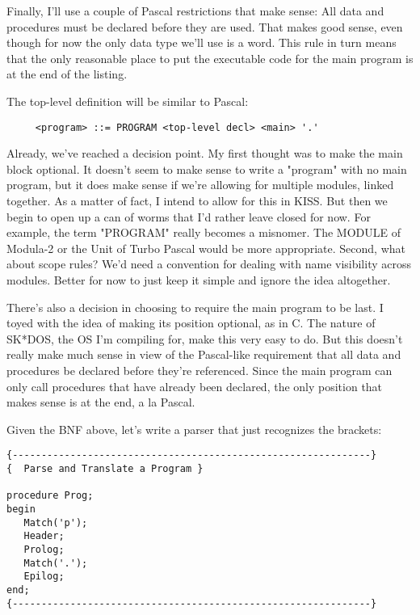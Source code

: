 Finally, I'll  use  a couple of Pascal  restrictions  that  make sense:  All data and procedures must be declared before  they are used. That makes good sense, even  though for now the only data type we'll use  is a word. This rule in turn means that the only reasonable place to put the  executable code for the main program is at the end of the listing.

The top-level definition will be similar to Pascal:

\begin{verbatim}
     <program> ::= PROGRAM <top-level decl> <main> '.'
\end{verbatim}

Already, we've reached a decision point. My first thought was to make the main block optional. It  doesn't seem to make sense to write a "program" with no main program, but it does make sense if we're  allowing  for  multiple modules, linked together. As  a matter of fact, I intend to allow for this in KISS. But then we begin  to open up a can of worms that I'd rather leave closed for now. For example, the  term "PROGRAM" really becomes a misnomer. The MODULE of Modula-2 or the Unit of Turbo Pascal would  be more appropriate. Second, what  about  scope  rules?    We'd  need a convention for  dealing  with  name  visibility  across  modules. Better  for  now  to  just  keep  it  simple  and ignore the idea altogether.

There's also a decision in choosing to require  the  main program to  be  last. I  toyed  with  the idea of making its  position optional, as  in  C. The nature of SK*DOS, the OS I'm compiling for, make this very easy to do. But  this  doesn't  really make much sense in view of the Pascal-like requirement  that  all data and procedures  be declared before they're referenced. Since the main  program can only call procedures  that  have  already  been declared, the only position that makes sense is at the end, a la Pascal.

Given  the  BNF  above, let's write a parser that just recognizes the brackets:

\begin{verbatim}
{--------------------------------------------------------------}
{  Parse and Translate a Program }

procedure Prog;
begin
   Match('p');
   Header;
   Prolog;
   Match('.');
   Epilog;
end;
{--------------------------------------------------------------}
\end{verbatim}

